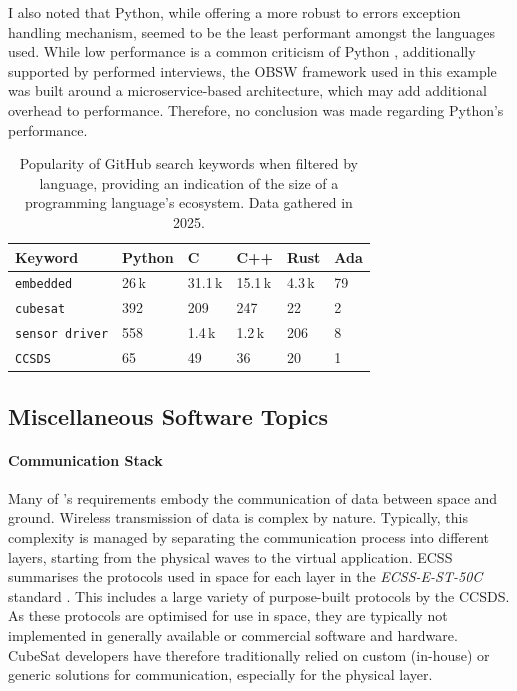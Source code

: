 \documentclass[a4paper,nobib,justified,final]{tufte-book}
\begin{document}
\begin{itemize}
	I also noted that Python, while offering a more robust to errors exception handling mechanism, seemed to be the least performant amongst the languages used. While low performance is a common criticism of Python \autocite{stoicoEmpiricalStudyPerformance2025}, additionally supported by performed interviews, the \acs{OBSW} framework used in this example was built around a microservice-based architecture, which may add additional overhead to performance. Therefore, no conclusion was made regarding Python's performance.
\end{itemize}

\begin{table}[h]
	\centering
	\caption[Popularity of GitHub search keywords when filtered by language]{Popularity of GitHub search keywords when filtered by language, providing an indication of the size of a programming language's ecosystem. Data gathered in 2025.}
	\label{tab:m_software_popularity}
	\begin{tabular}{@{}llllll@{}}
		\toprule
		\textbf{Keyword} & \textbf{Python} & \textbf{C} & \textbf{C++} & \textbf{Rust} & \textbf{Ada} \\ \midrule
		\texttt{embedded} & 26\,k & 31.1\,k & 15.1\,k & 4.3\,k & 79 \\
		\texttt{cubesat} & 392 & 209 & 247 & 22 & 2 \\
		\texttt{sensor driver} & 558 & 1.4\,k & 1.2\,k & 206 & 8 \\
		\texttt{CCSDS} & 65 & 49 & 36 & 20 & 1 \\
		\bottomrule
	\end{tabular}
\end{table}

\FloatBarrier
\subsection[Miscellaneous Software Topics]{Miscellaneous Software Topics}
\label{sec:METHODOLOGY_misc_software}

\paragraph{Communication Stack}
Many of 's requirements embody the communication of data between space and ground. Wireless transmission of data is complex by nature. Typically, this complexity is managed by separating the communication process into different layers, starting from the physical waves to the virtual application. \acs{ECSS} summarises the protocols used in space for each layer in the \emph{ECSS-E-ST-50C} standard \autocite{ECSS-E-ST-50C}. This includes a large variety of purpose-built protocols by the \acf{CCSDS}. As these protocols are optimised for use in space, they are typically not implemented in generally available or commercial software and hardware.
CubeSat developers have therefore traditionally relied on custom (in-house) or generic solutions for communication, especially for the physical layer.
\end{document}

